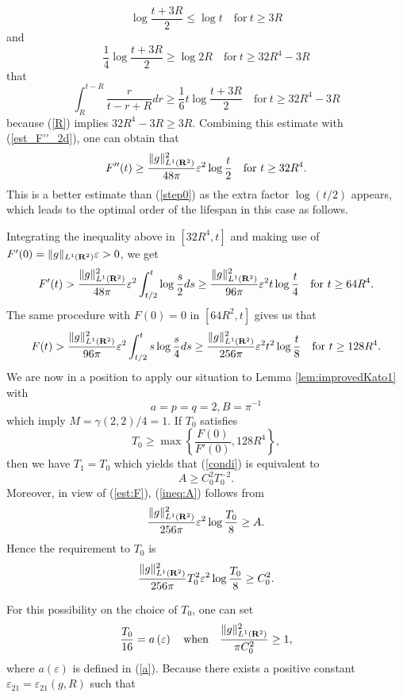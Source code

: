 \documentclass[a4paper,12pt]{article}
\numberwithin{equation}{section}
\def\R{{\bf R}}
\def\e{{\varepsilon}}
\begin{document}
\[
\log\frac{t+3R}{2}\le\log t\quad\mbox{for}\ t\ge3R
\]
and
\[
\frac{1}{4}\log\frac{t+3R}{2}\ge\log2R
\quad\mbox{for}\ t\ge32R^4-3R
\]
that
\[
\int_R^{t-R}\frac{r}{t-r+R}dr\ge\frac{1}{6}t\log\frac{t+3R}{2}
\quad\mbox{for}\ t\ge32R^4-3R
\]
because (\ref{R}) implies $32R^4-3R\ge3R$.
Combining this estimate with (\ref{est_F''_2d}), one can obtain that
\[
F''(t)\ge\frac{\|g\|^2_{L^1(\R^2)}}{48\pi}\e^2\log\frac{t}{2}
\quad\mbox{for}\ t\ge 32R^4.
\]
This is a better estimate than (\ref{step0}) as the extra factor $\log(t/2)$ appears,
which leads to the optimal order of the lifespan in this case as follows.
\par
Integrating the inequality above in $[32R^4,t]$ and making use of $F'(0)=\|g\|_{L^1(\R^2)}\e>0$,
we get
\[
F'(t)>\frac{\|g\|^2_{L^1(\R^2)}}{48\pi}\e^2\int_{t/2}^t\log\frac{s}{2}ds
\ge\frac{\|g\|^2_{L^1(\R^2)}}{96\pi}\e^2t\log\frac{t}{4}
\quad\mbox{for}\ t\ge 64R^4.
\]
The same procedure with $F(0)=0$ in $[64R^2,t]$ gives us that
\begin{equation}
\label{est:F}
F(t)>\frac{\|g\|^2_{L^1(\R^2)}}{96\pi}\e^2\int_{t/2}^ts\log\frac{s}{4}ds
\ge\frac{\|g\|^2_{L^1(\R^2)}}{256\pi}\e^2t^2\log\frac{t}{8}
\quad\mbox{for}\ t\ge 128R^4.
\end{equation}
We are now in a position to apply our situation to Lemma \ref{lem:improvedKato1} with
\[
a=p=q=2,B=\pi^{-1}
\]
which imply $M=\gamma(2,2)/4=1$.
If $T_0$ satisfies
\begin{equation}
\label{est:T_0}
T_0\ge\max\left\{\frac{F(0)}{F'(0)},128R^4\right\},
\end{equation}
then we have $T_1=T_0$ which yields that
 (\ref{condi}) is equivalent to
\begin{equation}
\label{condi:C_0}
A\ge C_0^2T_0^{-2}.
\end{equation}
Moreover,  in view of (\ref{est:F}), (\ref{ineq:A}) follows from
\begin{equation}
\label{condi:A}
\frac{\|g\|^2_{L^1(\R^2)}}{256\pi}\e^2\log\frac{T_0}{8}\ge A.
\end{equation}
Hence the requirement to $T_0$ is
\begin{equation}
\label{condi:T_0}
\frac{\|g\|^2_{L^1(\R^2)}}{256\pi}T_0^2\e^2\log\frac{T_0}{8}\ge C_0^2.
\end{equation}
\par
For this possibility on the choice of $T_0$, one can set
\[
\frac{T_0}{16}=a\left(\e\right)\quad\mbox{when}\quad \frac{\|g\|^2_{L^1(\R^2)}}{\pi C_0^2}\ge1,
\]
where $a(\e)$ is defined in (\ref{a}).
Because there exists a positive constant $\e_{21}=\e_{21}(g,R)$ such that
\end{document}
